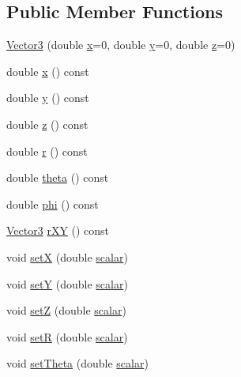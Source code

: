 \subsection*{Public Member Functions}
\begin{DoxyCompactItemize}
\item 
\mbox{\hyperlink{class_vector3_a6151fc844ddb2aaa316317b922cb8d22}{Vector3}} (double \mbox{\hyperlink{class_vector3_a58680da7b1109919f9912cc8c5d4d54d}{x}}=0, double \mbox{\hyperlink{class_vector3_aa86961f470134f1c7ca3eec7a88ad069}{y}}=0, double \mbox{\hyperlink{class_vector3_aff9b42255ac1e08c52a5eda5a4513a48}{z}}=0)
\item 
double \mbox{\hyperlink{class_vector3_a58680da7b1109919f9912cc8c5d4d54d}{x}} () const
\item 
double \mbox{\hyperlink{class_vector3_aa86961f470134f1c7ca3eec7a88ad069}{y}} () const
\item 
double \mbox{\hyperlink{class_vector3_aff9b42255ac1e08c52a5eda5a4513a48}{z}} () const
\item 
double \mbox{\hyperlink{class_vector3_acbf6dfc367121fd82a153c4593306145}{r}} () const
\item 
double \mbox{\hyperlink{class_vector3_a30c86ee94c98070b469a56fa4f7fde4f}{theta}} () const
\item 
double \mbox{\hyperlink{class_vector3_af04a3d08dae7f1ba36ee3feaf3bc8a4c}{phi}} () const
\item 
\mbox{\hyperlink{class_vector3}{Vector3}} \mbox{\hyperlink{class_vector3_aaf2a01831ab227b33593145fc21f74d6}{r\+XY}} () const
\item 
void \mbox{\hyperlink{class_vector3_add0f1fd39742bfcc74a0d9fe620e0178}{setX}} (double \mbox{\hyperlink{class_vector3_af757c4bd03bd4ddfa74c99fd5a3eee94}{scalar}})
\item 
void \mbox{\hyperlink{class_vector3_a3197fa0880adc862a01f9bf29dd83e10}{setY}} (double \mbox{\hyperlink{class_vector3_af757c4bd03bd4ddfa74c99fd5a3eee94}{scalar}})
\item 
void \mbox{\hyperlink{class_vector3_a4404619e2da9f0717c2d1b68fa4830f2}{setZ}} (double \mbox{\hyperlink{class_vector3_af757c4bd03bd4ddfa74c99fd5a3eee94}{scalar}})
\item 
void \mbox{\hyperlink{class_vector3_a9beef32ceaebce5bd595fd016e65be4f}{setR}} (double \mbox{\hyperlink{class_vector3_af757c4bd03bd4ddfa74c99fd5a3eee94}{scalar}})
\item 
void \mbox{\hyperlink{class_vector3_a55a6be6dca9ee66a9bfe497ac8a0c13f}{set\+Theta}} (double \mbox{\hyperlink{class_vector3_af757c4bd03bd4ddfa74c99fd5a3eee94}{scalar}})

\end{DoxyCompactItemize}
